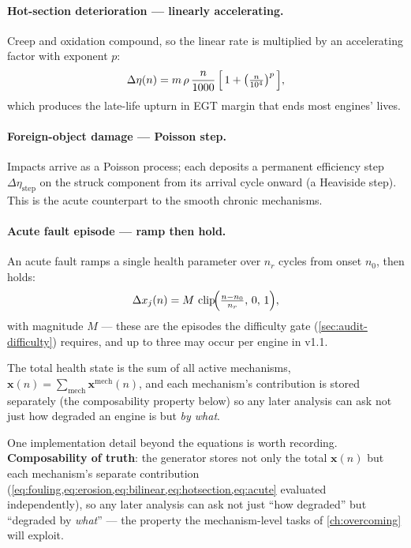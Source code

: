 \paragraph{Hot-section deterioration --- linearly accelerating.} Creep and oxidation
compound, so the linear rate is multiplied by an accelerating factor with exponent $p$:
\begin{equation}
  \Delta\eta(n) = m\,\rho\,\frac{n}{1000}\,
  \Bigl[\,1 + \bigl(\tfrac{n}{10^4}\bigr)^{p}\,\Bigr],
  \label{eq:hotsection}
\end{equation}
which produces the late-life upturn in EGT margin that ends most engines' lives.

\paragraph{Foreign-object damage --- Poisson step.} Impacts arrive as a Poisson process;
each deposits a permanent efficiency step $\Delta\eta_{\text{step}}$ on the struck
component from its arrival cycle onward (a Heaviside step). This is the acute counterpart
to the smooth chronic mechanisms.

\paragraph{Acute fault episode --- ramp then hold.} An acute fault ramps a single health
parameter over $n_r$ cycles from onset $n_0$, then holds:
\begin{equation}
  \Delta x_j(n) = M\,\operatorname{clip}\!\Bigl(\tfrac{n - n_0}{n_r},\, 0,\, 1\Bigr),
  \label{eq:acute}
\end{equation}
with magnitude $M$ --- these are the episodes the difficulty gate
(\cref{sec:audit-difficulty}) requires, and up to three may occur per engine in v1.1.

The total health state is the sum of all active mechanisms, $\mathbf{x}(n) = \sum_{\text{mech}}
\mathbf{x}^{\text{mech}}(n)$, and each mechanism's contribution is stored separately (the
composability property below) so any later analysis can ask not just how degraded an engine
is but \emph{by what}.

One implementation detail beyond the equations is worth recording. \textbf{Composability of
truth}: the generator stores not only the total $\mathbf{x}(n)$ but each mechanism's separate
contribution (\cref{eq:fouling,eq:erosion,eq:bilinear,eq:hotsection,eq:acute} evaluated
independently), so any later analysis can ask not just ``how degraded'' but ``degraded by
\emph{what}'' --- the property the mechanism-level tasks of \cref{ch:overcoming} will exploit.

